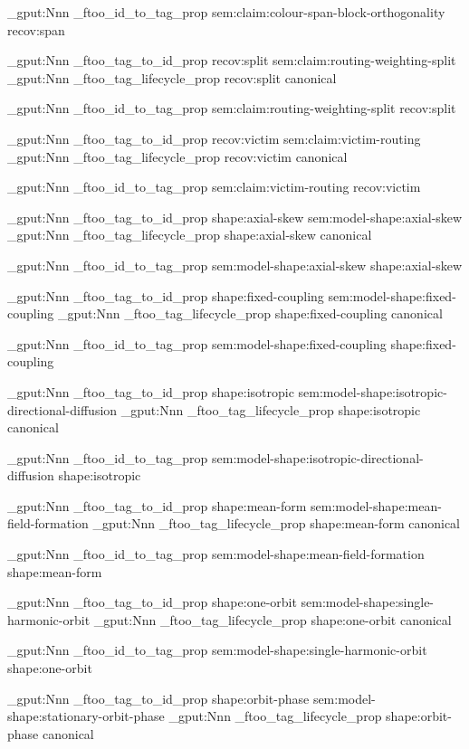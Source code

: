 \prop_gput:Nnn \g_ftoo_id_to_tag_prop { sem:claim:colour-span-block-orthogonality } { recov:span }


\prop_gput:Nnn \g_ftoo_tag_to_id_prop { recov:split } { sem:claim:routing-weighting-split }
\prop_gput:Nnn \g_ftoo_tag_lifecycle_prop { recov:split } { canonical }

\prop_gput:Nnn \g_ftoo_id_to_tag_prop { sem:claim:routing-weighting-split } { recov:split }


\prop_gput:Nnn \g_ftoo_tag_to_id_prop { recov:victim } { sem:claim:victim-routing }
\prop_gput:Nnn \g_ftoo_tag_lifecycle_prop { recov:victim } { canonical }

\prop_gput:Nnn \g_ftoo_id_to_tag_prop { sem:claim:victim-routing } { recov:victim }


\prop_gput:Nnn \g_ftoo_tag_to_id_prop { shape:axial-skew } { sem:model-shape:axial-skew }
\prop_gput:Nnn \g_ftoo_tag_lifecycle_prop { shape:axial-skew } { canonical }

\prop_gput:Nnn \g_ftoo_id_to_tag_prop { sem:model-shape:axial-skew } { shape:axial-skew }


\prop_gput:Nnn \g_ftoo_tag_to_id_prop { shape:fixed-coupling } { sem:model-shape:fixed-coupling }
\prop_gput:Nnn \g_ftoo_tag_lifecycle_prop { shape:fixed-coupling } { canonical }

\prop_gput:Nnn \g_ftoo_id_to_tag_prop { sem:model-shape:fixed-coupling } { shape:fixed-coupling }


\prop_gput:Nnn \g_ftoo_tag_to_id_prop { shape:isotropic } { sem:model-shape:isotropic-directional-diffusion }
\prop_gput:Nnn \g_ftoo_tag_lifecycle_prop { shape:isotropic } { canonical }

\prop_gput:Nnn \g_ftoo_id_to_tag_prop { sem:model-shape:isotropic-directional-diffusion } { shape:isotropic }


\prop_gput:Nnn \g_ftoo_tag_to_id_prop { shape:mean-form } { sem:model-shape:mean-field-formation }
\prop_gput:Nnn \g_ftoo_tag_lifecycle_prop { shape:mean-form } { canonical }

\prop_gput:Nnn \g_ftoo_id_to_tag_prop { sem:model-shape:mean-field-formation } { shape:mean-form }


\prop_gput:Nnn \g_ftoo_tag_to_id_prop { shape:one-orbit } { sem:model-shape:single-harmonic-orbit }
\prop_gput:Nnn \g_ftoo_tag_lifecycle_prop { shape:one-orbit } { canonical }

\prop_gput:Nnn \g_ftoo_id_to_tag_prop { sem:model-shape:single-harmonic-orbit } { shape:one-orbit }


\prop_gput:Nnn \g_ftoo_tag_to_id_prop { shape:orbit-phase } { sem:model-shape:stationary-orbit-phase }
\prop_gput:Nnn \g_ftoo_tag_lifecycle_prop { shape:orbit-phase } { canonical }

